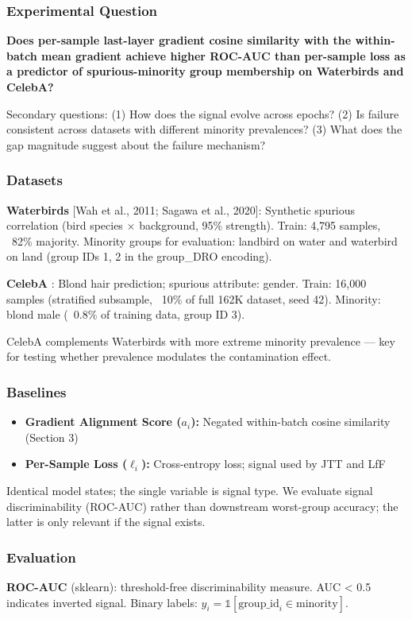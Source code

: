 
\subsubsection{Experimental Question}

\textbf{Does per-sample last-layer gradient cosine similarity with the within-batch mean gradient achieve higher ROC-AUC than per-sample loss as a predictor of spurious-minority group membership on Waterbirds and CelebA?}

Secondary questions: (1) How does the signal evolve across epochs? (2) Is failure consistent across datasets with different minority prevalences? (3) What does the gap magnitude suggest about the failure mechanism?

\subsubsection{Datasets}

\textbf{Waterbirds} [Wah et al., 2011; Sagawa et al., 2020]: Synthetic spurious correlation (bird species $\times$ background, 95\% strength). Train: 4,795 samples, ~82\% majority. Minority groups for evaluation: landbird on water and waterbird on land (group IDs {1, 2} in the group\_DRO encoding).

\textbf{CelebA} \citep{Liu2015}: Blond hair prediction; spurious attribute: gender. Train: 16,000 samples (stratified subsample, ~10\% of full 162K dataset, seed 42). Minority: blond male (~0.8\% of training data, group ID 3).

CelebA complements Waterbirds with more extreme minority prevalence --- key for testing whether prevalence modulates the contamination effect.

\subsubsection{Baselines}

\begin{itemize}
\item \textbf{Gradient Alignment Score ($a_i$):} Negated within-batch cosine similarity (Section 3)
\item \textbf{Per-Sample Loss ($\ell_i$):} Cross-entropy loss; signal used by JTT and LfF
\end{itemize}

Identical model states; the single variable is signal type. We evaluate signal discriminability (ROC-AUC) rather than downstream worst-group accuracy; the latter is only relevant if the signal exists.

\subsubsection{Evaluation}

\textbf{ROC-AUC} (sklearn): threshold-free discriminability measure. AUC < 0.5 indicates inverted signal. Binary labels: $y_i = \mathbb{1}[\text{group\_id}_i \in \text{minority}]$.

